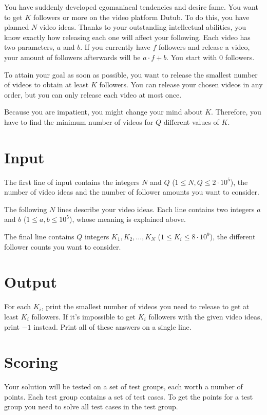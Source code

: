 
\noindent
You have suddenly developed egomaniacal tendencies and desire fame. You want to get $K$ followers or more on the video platform
Dutub. To do this, you have planned $N$ video ideas. Thanks to your outstanding intellectual abilities, you know exactly
how releasing each one will affect your following. Each video has two parameters, $a$ and $b$. If you currently have $f$ followers
and release a video, your amount of followers afterwards will be $a \cdot f + b$. You start with $0$ followers.

To attain your goal as soon as possible, you want to release the smallest number of videos to obtain at least $K$ followers.
You can release your chosen videos in any order, but you can only release each video at most once.

Because you are impatient, you might change your mind about $K$. Therefore, you have to find the minimum number of videos
for $Q$ different values of $K$.

\section*{Input}
The first line of input contains the integers $N$ and $Q$ ($1 \le N, Q \le 2 \cdot 10^5$), the number of video ideas
and the number of follower amounts you want to consider.

The following $N$ lines describe your video ideas. Each line contains two integers $a$ and $b$ ($1 \leq a, b \leq 10^5$),
whose meaning is explained above.

The final line contains $Q$ integers $K_1, K_2, \dots, K_N$ ($1 \leq K_i \leq 8 \cdot 10^9$), the different follower counts
you want to consider.

\section*{Output}
For each $K_i$, print the smallest number of videos you need to release to get at least $K_i$ followers. If it's impossible
to get $K_i$ followers with the given video ideas, print $-1$ instead.
Print all of these answers on a single line.

\section*{Scoring}
Your solution will be tested on a set of test groups, each worth a number of points. Each test group contains
a set of test cases. To get the points for a test group you need to solve all test cases in the test group.

